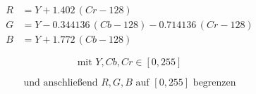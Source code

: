 \documentclass[tikz,border=6pt]{standalone}
\begin{document}
\[
\begin{aligned}
R &= Y + 1.402\,(Cr - 128) \\
G &= Y - 0.344136\,(Cb - 128) - 0.714136\,(Cr - 128) \\
B &= Y + 1.772\,(Cb - 128)
\end{aligned}
\]

\[
\text{mit } Y, Cb, Cr \in [0,255]
\]

\[
\text{und anschließend } R, G, B \text{ auf } [0,255] \text{ begrenzen}
\]
\end{document}
